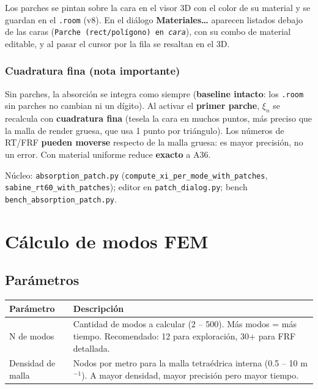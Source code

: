 \documentclass[11pt, a4paper]{article}
\newcommand{\menu}[1]{\textbf{\guillemotleft #1\guillemotright}}
\begin{document}
Los parches se pintan sobre la cara en el visor 3D con el color de su material y
se guardan en el \texttt{.room} (v8). En el diálogo \menu{Materiales\ldots}
aparecen listados debajo de las caras (\texttt{Parche (rect/polígono) en
\emph{cara}}), con su combo de material editable, y al pasar el cursor por la
fila se resaltan en el 3D.

\subsubsection*{Cuadratura fina (nota importante)}

Sin parches, la absorción se integra como siempre (\textbf{baseline intacto}:
los \texttt{.room} sin parches no cambian ni un dígito). Al activar el
\textbf{primer parche}, $\xi_n$ se recalcula con \textbf{cuadratura fina}
(tesela la cara en muchos puntos, más preciso que la malla de render gruesa,
que usa 1 punto por triángulo). Los números de RT/FRF \textbf{pueden moverse}
respecto de la malla gruesa: es mayor precisión, no un error. Con material
uniforme reduce \textbf{exacto} a A36.

Núcleo: \texttt{absorption\_patch.py}
(\texttt{compute\_xi\_per\_mode\_with\_patches}, \texttt{sabine\_rt60\_with\_patches});
editor en \texttt{patch\_dialog.py}; bench \texttt{bench\_absorption\_patch.py}.

\section{Cálculo de modos FEM}

\subsection{Parámetros}

\begin{tabular}{lp{9cm}}
  \toprule
  Parámetro & Descripción \\
  \midrule
  N\textordmasculine{} de modos & Cantidad de modos a calcular (2 – 500). Más modos = más
    tiempo. Recomendado: 12 para exploración, 30+ para FRF detallada. \\
  Densidad de malla & Nodos por metro para la malla tetraédrica interna
    (0.5 – 10 m$^{-1}$). A mayor densidad, mayor precisión pero mayor tiempo. \\
  \bottomrule
\end{tabular}
\end{document}
